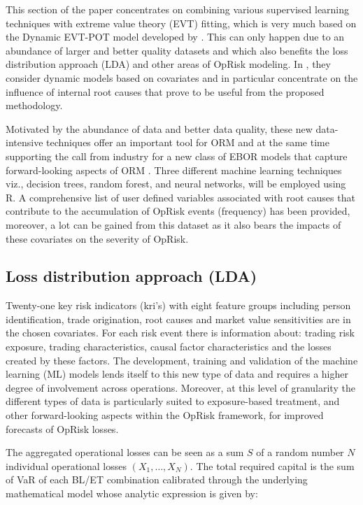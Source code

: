 \documentclass[a4paper]{article}
\begin{document}
This section of the paper concentrates on combining various supervised learning techniques with extreme value theory (EVT) fitting, which is very much based on the Dynamic EVT-POT model developed by \cite{chavez2016extreme}. This can only happen due to an abundance of larger and better quality datasets and which also benefits the loss distribution approach (LDA) and other areas of OpRisk modeling.  In \cite{chavez2016extreme}, they consider dynamic models based on covariates and in particular concentrate on the influence of internal root causes that prove to be useful from the proposed methodology.    

Motivated by the abundance of data and better data quality, these new data-intensive techniques offer an important tool for ORM and at the same time supporting the call from industry for a new class of EBOR models that capture forward-looking aspects of ORM \citep{embrechts2018modeling}. Three different machine learning techniques viz., decision trees, random forest, and neural networks, will be employed using R. A comprehensive list of user defined variables associated with root causes that contribute to the accumulation of OpRisk events (frequency) has been provided, moreover, a lot can be gained from this dataset as it also bears the impacts of these covariates on the severity of OpRisk. 

\subsection{Loss distribution approach (LDA)}

Twenty-one key risk indicators (kri's) with eight feature groups including person identification, trade origination, root causes and market value sensitivities are in the chosen covariates. For each risk event there is information about: trading risk exposure, trading characteristics, causal factor characteristics and the losses created by these factors. The development, training and validation of the machine learning (ML) models lends itself to this new type of data and requires a higher degree of involvement across operations. Moreover, at this level of granularity the different types of data is particularly suited to exposure-based treatment, and other forward-looking aspects within the OpRisk framework, for improved forecasts of OpRisk losses.\medskip

The aggregated operational losses can be seen as a sum $S$ of a random number $N$ individual operational losses \begin{math} (X_1, \ldots, X_N )\end{math}. The total required capital is the sum of VaR of each BL/ET combination calibrated through the underlying mathematical model whose analytic expression is given by: 
\end{document}
